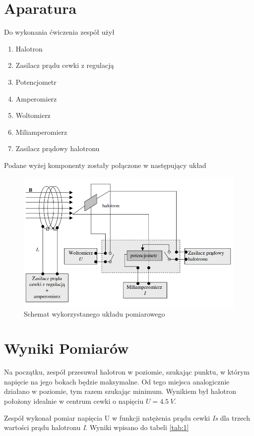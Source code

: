 \documentclass{article}
\begin{document}
\section{Aparatura}
Do wykonania ćwiczenia zespół użył 
\begin{enumerate}
    \item Halotron
    \item Zasilacz prądu cewki z regulacją
    \item Potencjometr
    \item Amperomierz
    \item Woltomierz
    \item Miliamperomierz
    \item Zasilacz prądowy halotronu
\end{enumerate}
Podane wyżej komponenty zostały połączone w następujący układ
\begin{figure}[h!]
    \centering
    \includegraphics[scale=0.6]{cw43/halotron.png}
    \caption{Schemat wykorzystanego układu pomiarowego}
\end{figure}
\newpage
\section{Wyniki Pomiarów}
Na początku, zespół przesuwał halotron w poziomie, szukając punktu, w którym napięcie na jego bokach będzie maksymalne.
Od tego miejsca analogicznie działano w poziomie, tym razem szukając minimum.
Wynikiem był halotron położony idealnie w centrum cewki o napięciu $U = \SI{4.5}{V}$.

Zespół  wykonał pomiar napięcia U w funkcji natężenia prądu cewki \textit{Is} dla trzech wartości prądu halotronu 
\textit{I}. Wyniki wpisano do tabeli \ref{tab:1}
\end{document}
